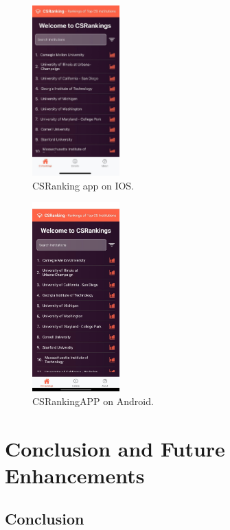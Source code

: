 \documentclass[12pt]{article}
\begin{document}
\begin{figure}[H]
    \centering
    \includegraphics[width=0.3\textwidth, height=0.5\textheight]{homeios.jpeg} %
    \caption{CSRanking app on IOS.}
    \label{fig:example_image}
\end{figure}

\begin{figure}[H]
    \centering
    \includegraphics[width=0.3\textwidth, height=0.5\textheight]{home.jpg} %
    \caption{CSRankingAPP on Android.}
    \label{fig:example_image}
\end{figure}

\section{Conclusion and Future Enhancements}

\subsection{Conclusion}
\end{document}
